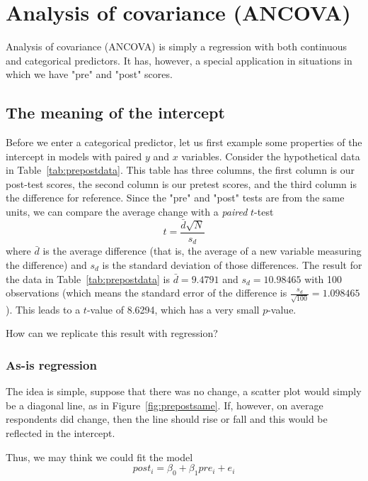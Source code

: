 

\chapter{Analysis of covariance (ANCOVA)}

Analysis of covariance (ANCOVA) is simply a regression with both continuous and categorical predictors. It has, however, a special application in situations in which we have "pre" and "post" scores.

\section{The meaning of the intercept}

Before we enter a categorical predictor, let us first example some properties of the intercept in models with paired $y$ and $x$ variables. Consider the hypothetical data in Table~\ref{tab:prepostdata}. This table has three columns, the first column is our post-test scores, the second column is our pretest scores, and the third column is the difference for reference. Since the "pre" and "post" tests are from the same units, we can compare the average change with a {\it paired} $t$-test
\begin{equation}
t=\frac{\bar{d}\sqrt{N}}{s_{d}}
\end{equation}
where $\bar{d}$ is the average difference (that is, the average of a new variable measuring the difference) and $s_{d}$ is the standard deviation of those differences. The result for the data in Table~\ref{tab:prepostdata} is $\bar{d}=9.4791$ and $s_{d} = 10.98465$ with 100 observations (which means the standard error of the difference is $\frac{s_{d}}{\sqrt{100}}=1.098465$). This leads to a $t$-value of 8.6294, which has a very small $p$-value.

How can we replicate this result with regression?

\subsection{As-is regression}

The idea is simple, suppose that there was no change, a scatter plot would simply be a diagonal line, as in Figure~\ref{fig:prepostsame}. If, however, on average respondents did change, then the line should rise or fall and this would be reflected in the intercept.

Thus, we may think we could fit the model
\begin{equation}
post_i = \beta_0 + \beta_1 pre_i + e_i
\end{equation}

